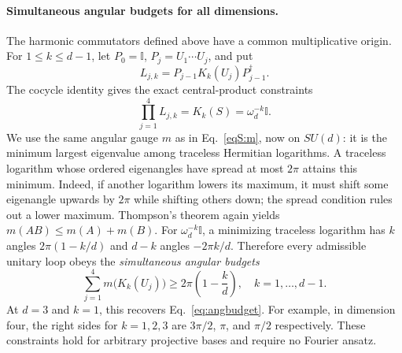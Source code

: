 \documentclass[aps,prl,reprint,superscriptaddress,nofootinbib]{revtex4-2}
\newcommand{\id}{\mathbb{I}}
\begin{document}
\paragraph{Simultaneous angular budgets for all dimensions.}
The harmonic commutators defined above have a common multiplicative origin. For $1\leq k\leq d-1$, let $P_0=\id$, $P_j=U_1\cdots U_j$, and put
\begin{equation}
L_{j,k}=P_{j-1}K_k(U_j)P_{j-1}^{\dagger}.
\label{eqS:Ljk}
\end{equation}
The cocycle identity gives the exact central-product constraints
\begin{equation}
\prod_{j=1}^{4}L_{j,k}=K_k(S)=\omega_d^{-k}\id.
\label{eqS:centralall}
\end{equation}
We use the same angular gauge $m$ as in Eq.~\eqref{eqS:m}, now on $SU(d)$: it is the minimum largest eigenvalue among traceless Hermitian logarithms. A traceless logarithm whose ordered eigenangles have spread at most $2\pi$ attains this minimum. Indeed, if another logarithm lowers its maximum, it must shift some eigenangle upwards by $2\pi$ while shifting others down; the spread condition rules out a lower maximum. Thompson's theorem again yields
$m(AB)\leq m(A)+m(B)$.
For $\omega_d^{-k}\id$, a minimizing traceless logarithm has $k$ angles $2\pi(1-k/d)$ and $d-k$ angles $-2\pi k/d$. Therefore every admissible unitary loop obeys the \emph{simultaneous angular budgets}
\begin{equation}
\sum_{j=1}^{4}m\bigl(K_k(U_j)\bigr)\geq
2\pi\left(1-\frac{k}{d}\right),\quad k=1,\ldots,d-1.
\label{eqS:allbudgets}
\end{equation}
At $d=3$ and $k=1$, this recovers Eq.~\eqref{eq:angbudget}. For example, in dimension four, the right sides for $k=1,2,3$ are $3\pi/2$, $\pi$, and $\pi/2$ respectively. These constraints hold for arbitrary projective bases and require no Fourier ansatz.
\end{document}
